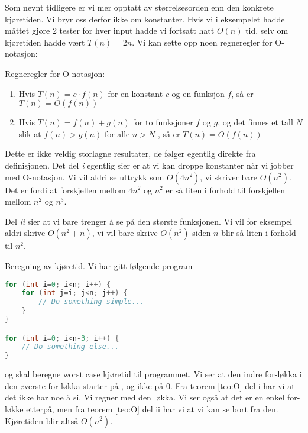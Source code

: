 Som nevnt tidligere er vi mer opptatt av størrelsesorden enn den konkrete kjøretiden. Vi bryr oss derfor ikke om konstanter. Hvis vi i eksempelet hadde måttet gjøre 2 tester for hver input hadde vi fortsatt hatt $ O(n) $ tid, selv om kjøretiden hadde vært $ T(n) = 2n $. Vi kan sette opp noen regneregler for O-notasjon:
\begin{theorem}
\label{teo:O}
Regneregler for O-notasjon:
\begin{enumerate}[i]
	\item Hvis $ T(n) = c\cdot f(n) $ for en konstant $ c $ og en funksjon $ f $, så er $ T(n) = O(f(n)) $
	\item Hvis $ T(n) = f(n) + g(n) $ for to funksjoner $ f $ og $ g $, og det finnes et tall $ N $ slik at $ f(n) > g(n) $ for alle $ n > N$ , så er $ T(n) = O(f(n)) $
\end{enumerate}
\end{theorem}

Dette er ikke veldig storlagne resultater, de følger egentlig direkte fra definisjonen. Det del \textit{i} egentlig sier er at vi kan droppe konstanter når vi jobber med O-notasjon. Vi vil aldri se uttrykk som $ O(4n^2) $, vi skriver bare $ O(n^2) $. Det er fordi at forskjellen mellom $ 4n^2 $ og $ n^2 $ er så liten i forhold til forskjellen mellom $ n^2 $ og $ n^3 $. 

Del \textit{ii} sier at vi bare trenger å se på den største funksjonen. Vi vil for eksempel aldri skrive $ O(n^2 + n) $, vi vil bare skrive $ O(n^2) $ siden $ n $ blir så liten i forhold til $ n^2 $.


\begin{example} Beregning av kjøretid. Vi har gitt følgende program
\begin{lstlisting}[language=Java,
commentstyle=\color{source_brown}\monofontitalic, 
morekeywords={String},
keywordstyle=\color{source_blue}\monofontbold,
stringstyle=\color{source_orange}]
for (int i=0; i<n; i++) {
    for (int j=i; j<n; j++) {
        // Do something simple...
    }
}

for (int i=0; i<n-3; i++) {
    // Do something else...
}
\end{lstlisting}
og skal beregne worst case kjøretid til programmet. Vi ser at den indre for-løkka i den øverste for-løkka starter på , og ikke på 0. Fra teorem \ref{teo:O} del i har vi at det ikke har noe å si. Vi regner med den løkka. Vi ser også at det er en enkel for-løkke etterpå, men fra teorem \ref{teo:O} del ii har vi at vi kan se bort fra den. Kjøretiden blir altså $ O(n^2) $.
\end{example}

